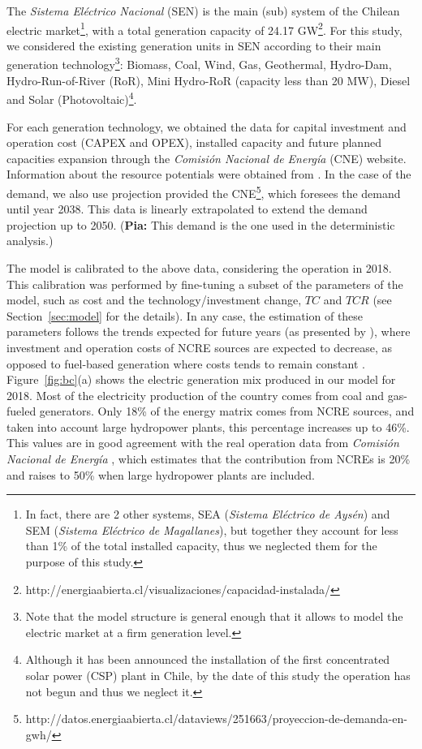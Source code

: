 \documentclass[11pt, letterpaper]{article}
\newcommand{\pia}[1]{{\color{magenta}({\bf Pia: }#1)}}
\begin{document}
The \textit{Sistema El\'ectrico Nacional} (SEN) is the main (sub) system of the Chilean electric market\footnote{In fact, there are 2 other systems, SEA (\textit{Sistema El\'ectrico de Ays\'en}) and SEM (\textit{Sistema El\'ectrico de Magallanes}), but together they account  for less than 1\% of the total installed capacity, thus we neglected them for the purpose of this study.},  with a total generation capacity of 24.17 GW\footnote{http://energiaabierta.cl/visualizaciones/capacidad-instalada/}. For this study, we considered the existing generation units in SEN according to their main generation technology\footnote{Note that the model structure is general enough that it allows to model the electric market at a firm generation level.}: Biomass, Coal, Wind, Gas, Geothermal, Hydro-Dam, Hydro-Run-of-River (RoR), Mini Hydro-RoR (capacity less than 20 MW), Diesel and Solar (Photovoltaic)\footnote{ Although it has been announced the installation of the first concentrated solar power (CSP) plant in Chile, by the date of this study the operation has not begun and thus we neglect it. }.

\smallskip

For each generation technology, we obtained the data for capital investment and operation cost (CAPEX and OPEX), installed capacity and future planned capacities expansion through the \textit{Comisi\'on Nacional de Energ\'ia} (CNE) website. Information about the resource potentials were obtained from \cite{Santana2014potencial}.
In the case of the demand, we also use projection provided the CNE\footnote{http://datos.energiaabierta.cl/dataviews/251663/proyeccion-de-demanda-en-gwh/}, which foresees the demand until year 2038. This data is linearly extrapolated to extend the demand projection up to 2050. \pia{This demand  is the one used in the deterministic analysis.}

\smallskip

The model is calibrated to the above data, considering the operation in 2018. This calibration was performed by fine-tuning a subset of the parameters of the model, such as cost and the technology/investment change, $TC$ and $TCR$ (see Section~\ref{sec:model} for the details). In any case, the estimation of these parameters follows the trends expected for future years (as presented by \cite{Mena2019csp,NRELcosts}), where investment and operation costs of NCRE sources are expected to decrease, as opposed to fuel-based generation where costs tends to remain constant \cite{Mena2019csp,NRELcosts}.
Figure~\ref{fig:bc}(a) shows the electric generation mix produced in our model for 2018. Most of the electricity production of the country comes from coal and gas-fueled generators. Only 18\% of the energy matrix comes from NCRE sources, and taken into account large hydropower plants, this percentage increases up to  46\%. This values are in good agreement with the real operation data from \textit{Comisi\'on Nacional de Energ\'ia} \cite{CNE2018}, which estimates that the contribution from NCREs is 20\% and raises to 50\% when large hydropower plants are included. 
\end{document}
